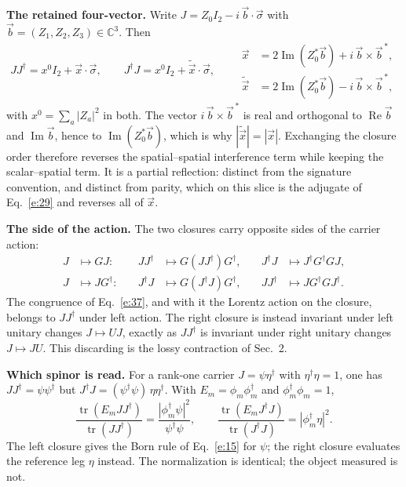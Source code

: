 \documentclass[10pt]{article}
\newcommand{\tr}{\operatorname{tr}}
\DeclareMathOperator{\Real}{Re}
\DeclareMathOperator{\Imag}{Im}
\begin{document}
\smallskip
\noindent\textbf{The retained four-vector.} Write $J=Z_0I_2-i\,\vec b\cdot\vec\sigma$ with $\vec b=(Z_1,Z_2,Z_3)\in\mathbb C^3$. Then
\begin{equation}
JJ^\dagger=x^0I_2+\vec x\cdot\vec\sigma,\qquad J^\dagger J=x^0I_2+\tilde{\vec x}\cdot\vec\sigma,\qquad
\begin{aligned}
\vec x&=2\Imag(Z_0^*\vec b)+i\,\vec b\times\vec b^{\,*},\\
\tilde{\vec x}&=2\Imag(Z_0^*\vec b)-i\,\vec b\times\vec b^{\,*},
\end{aligned}\label{e:44}
\end{equation}
with $x^0=\sum_a|Z_a|^2$ in both. The vector $i\,\vec b\times\vec b^{\,*}$ is real and orthogonal to $\Real\vec b$ and $\Imag\vec b$, hence to $\Imag(Z_0^*\vec b)$, which is why $|\tilde{\vec x}|=|\vec x|$. Exchanging the closure order therefore reverses the spatial--spatial interference term while keeping the scalar--spatial term. It is a partial reflection: distinct from the signature convention, and distinct from parity, which on this slice is the adjugate of Eq.~\eqref{e:29} and reverses all of $\vec x$.

\noindent\textbf{The side of the action.} The two closures carry opposite sides of the carrier action:
\begin{equation}
\begin{aligned}
J&\mapsto GJ:&\quad JJ^\dagger&\mapsto G(JJ^\dagger)G^\dagger,&\quad J^\dagger J&\mapsto J^\dagger G^\dagger GJ,\\
J&\mapsto JG^\dagger:&\quad J^\dagger J&\mapsto G(J^\dagger J)G^\dagger,&\quad JJ^\dagger&\mapsto JG^\dagger GJ^\dagger.
\end{aligned}\label{e:45}
\end{equation}
The congruence of Eq.~\eqref{e:37}, and with it the Lorentz action on the closure, belongs to $JJ^\dagger$ under left action. The right closure is instead invariant under left unitary changes $J\mapsto UJ$, exactly as $JJ^\dagger$ is invariant under right unitary changes $J\mapsto JU$. This discarding is the lossy contraction of Sec.~2.

\noindent\textbf{Which spinor is read.} For a rank-one carrier $J=\psi\eta^\dagger$ with $\eta^\dagger\eta=1$, one has $JJ^\dagger=\psi\psi^\dagger$ but $J^\dagger J=(\psi^\dagger\psi)\,\eta\eta^\dagger$. With $E_m=\phi_m\phi_m^\dagger$ and $\phi_m^\dagger\phi_m=1$,
\begin{equation}
\frac{\tr(E_mJJ^\dagger)}{\tr(JJ^\dagger)}=\frac{|\phi_m^\dagger\psi|^2}{\psi^\dagger\psi},\qquad \frac{\tr(E_mJ^\dagger J)}{\tr(J^\dagger J)}=|\phi_m^\dagger\eta|^2.\label{e:46}
\end{equation}
The left closure gives the Born rule of Eq.~\eqref{e:15} for $\psi$; the right closure evaluates the reference leg $\eta$ instead. The normalization is identical; the object measured is not.
\end{document}
